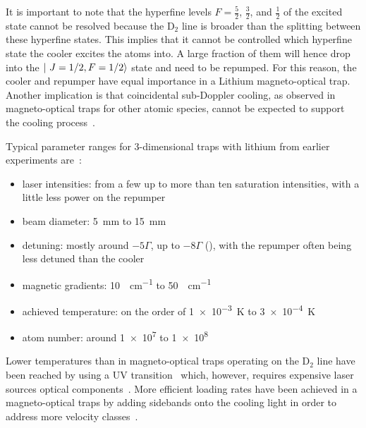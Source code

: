 It is important to note that the hyperfine levels $F = \frac{5}{2}$, $\frac{3}{2}$, and $\frac{1}{2}$ of the excited state cannot be resolved because the D$_2$ line is broader than the splitting between these hyperfine states. This implies that it cannot be controlled which hyperfine state the cooler excites the atoms into. A large fraction of them will hence drop into the $\Ket{~J=1/2, F=1/2}$ state and need to be repumped. For this reason, the cooler and repumper have equal importance in a Lithium magneto-optical trap. Another implication is that coincidental sub-Doppler cooling, as observed in magneto-optical traps for other atomic species, cannot be expected to support the cooling process~\cite{grier_lambda-enhanced_2013}.

Typical parameter ranges for 3-dimensional traps with lithium from earlier experiments are~\cite{
    tiecke_high-flux_2009,
    kawanaka_decay_1993,
    schunemann_magneto-optic_1998,
    mewes_simultaneous_1999,
    hilker_laser_2012,
    kerkmann_novel_2019,
    ladouceur_compact_2009,
    chen_lithium-cesium_2021,    
    burchianti_efficient_2014,
    li_enhanced_2015,
}:
\begin{itemize}
    \item laser intensities: from a few up to more than ten saturation intensities, with a little less power on the repumper
    \item beam diameter: \SI{5}{\milli\meter} to \SI{15}{\milli\meter}
    \item detuning: mostly around $-5\Gamma$, up to $-8 \Gamma$ (\cite{li_enhanced_2015}), with the repumper often being less detuned than the cooler 
    \item magnetic gradients: \SI{10}{\gauss\per\centi\meter} to \SI{50}{\gauss\per\centi\meter}
    \item achieved temperature: on the order of \SI{1e-3}{\kelvin} to \SI{3e-4}{\kelvin}
    \item atom number: around \SI{1e7}{} to \SI{1e8}{}
\end{itemize}

Lower temperatures than in magneto-optical traps operating on the D$_2$ line have been reached by using a UV transition~\cite{duarte_all-optical_2011,omran_microscopic_2015} which, however, requires expensive laser sources optical components~\cite{burchianti_efficient_2014}. More efficient loading rates have been achieved in a magneto-optical traps by adding sidebands onto the cooling light in order to address more velocity classes~\cite{li_enhanced_2015}.


